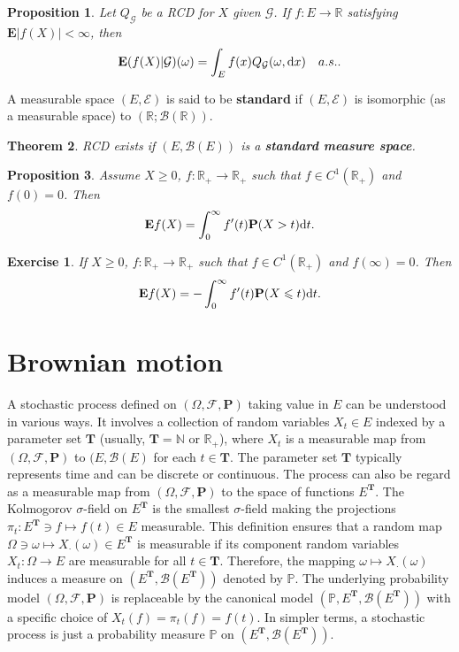 \documentclass[twoside, 12pt]{book}
\numberwithin{equation}{chapter}
\newtheorem{theorem}{Theorem}[section]
\newtheorem{proposition}[theorem]{Proposition}
\newtheorem{exercise}{Exercise}[section]
\def\cB{{\mathcal B}}
\def\cE{{\mathcal E}}
\def\cF{{\mathcal F}}
\def\cG{{\mathcal G}}
\def\mN{{\mathbb N}}
\def\mP{{\mathbb P}}
\def\mR{{\mathbb R}}
\def\bE{{\mathbf E}}
\def\bP{{\mathbf P}}
\def\bT{{\mathbf T}}
\def\geq{\geqslant}
\def\leq{\leqslant}
\def\d{\text{\rm{d}}}
\begin{document}
	\begin{proposition}
		Let $Q_{\cG}$ be a RCD for $X$ given $\cG$. If $f:E\to \mR$ satisfying $\bE |f(X)|<\infty$, then 
		\[
		\bE(f(X)|\cG)(\omega)= \int_{E} f(x) Q_{\cG}(\omega, \d x)\quad a.s.. 
		\]
	\end{proposition}
	
	A measurable space $(E, \cE)$ is said to be {\bf standard} if $(E,\cE)$ is isomorphic (as a measurable space) to $(\mR; \cB(\mR))$.
	
	\begin{theorem}
		RCD exists if $(E, \cB(E))$ is a {\bf standard measure space}. 
	\end{theorem}
	
		\begin{proposition}
		Assume $X\geq 0$, $f:\mR_+\to \mR_+$ such that $f\in C^1(\mR_+)$ and $f(0)=0$. Then 
		\begin{equation}
			\bE f(X)= \int_0^\infty f'(t) \bP (X>t) \d t. 
		\end{equation}
	\end{proposition}
	\begin{exercise}
		If $X\geq 0$, $f:\mR_+\to \mR_+$ such that $f\in C^1(\mR_+)$ and $f(\infty)=0$. Then 
		\begin{equation}
			\bE f(X)= -\int_0^\infty f'(t) \bP (X\leq t) \d t. 
		\end{equation}
	\end{exercise}
	
	\section{Brownian motion}
	A stochastic process defined on $(\Omega, \cF, \bP)$ taking value in $E$ can be understood in various ways. It involves a collection of random variables $X_t\in E$ indexed by a parameter set $\bT$ (usually, $\bT=\mN$ or $\mR_+$), where $X_t$ is a measurable map from $(\Omega, \cF,\bP)$ to $(E, \cB(E)$ for each $t\in \bT$. The parameter set $\bT$ typically represents time and can be discrete or continuous. The process can also be regard as a measurable map from $(\Omega, \cF, \bP)$ to the space of functions $E^\bT$. The Kolmogorov $\sigma$-field on $E^{\bT}$ is the smallest $\sigma$-field making the projections $\pi_t: E^{\bT} \ni f\mapsto f(t)\in E$ measurable. This definition ensures that a random map  $\Omega \ni \omega \mapsto X_{\cdot}(\omega) \in E^{\bT}$ is measurable if its component random variables $X_t:\Omega \to E$ are measurable for all $t\in \bT$. Therefore, the mapping $\omega\mapsto X_{\cdot}(\omega)$ induces a measure on $(E^{\bT}, \cB(E^{\bT}))$ denoted by $\mP$. The underlying probability model $(\Omega, \cF, \bP)$ is replaceable by the canonical model $(\mP, E^{\bT}, \cB(E^{\bT}))$ with a specific choice of $X_t(f)=\pi_t(f)=f(t)$. In simpler terms, a stochastic process is just a probability measure $\mP$ on $(E^{\bT}, \cB(E^{\bT}))$.
	
\end{document}
